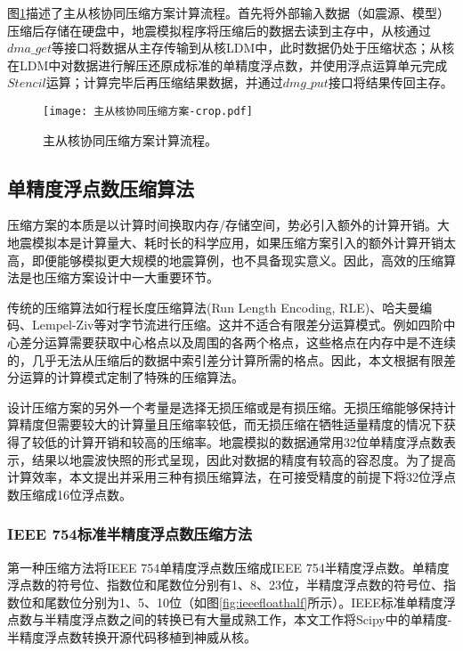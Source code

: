图\ref{fig:compression-workflow}描述了主从核协同压缩方案计算流程。首先将外部输入数据（如震源、模型）压缩后存储在硬盘中，地震模拟程序将压缩后的数据去读到主存中，从核通过$dma\_get$等接口将数据从主存传输到从核LDM中，此时数据仍处于压缩状态；从核在LDM中对数据进行解压还原成标准的单精度浮点数，并使用浮点运算单元完成$Stencil$运算；计算完毕后再压缩结果数据，并通过$dmg\_put$接口将结果传回主存。

\begin{figure}[ht]
\centering
\texttt{[image: 主从核协同压缩方案-crop.pdf]}
\caption{主从核协同压缩方案计算流程。}
\label{fig:compression-workflow}
\end{figure}

\subsection{单精度浮点数压缩算法}

压缩方案的本质是以计算时间换取内存/存储空间，势必引入额外的计算开销。大地震模拟本是计算量大、耗时长的科学应用，如果压缩方案引入的额外计算开销太高，即便能够模拟更大规模的地震算例，也不具备现实意义。因此，高效的压缩算法是也压缩方案设计中一大重要环节。

传统的压缩算法如行程长度压缩算法(Run Length Encoding, RLE)、哈夫曼编码、Lempel-Ziv等对字节流进行压缩。这并不适合有限差分运算模式。例如四阶中心差分运算需要获取中心格点以及周围的各两个格点，这些格点在内存中是不连续的，几乎无法从压缩后的数据中索引差分计算所需的格点。因此，本文根据有限差分运算的计算模式定制了特殊的压缩算法。

设计压缩方案的另外一个考量是选择无损压缩或是有损压缩。无损压缩能够保持计算精度但需要较大的计算量且压缩率较低，而无损压缩在牺牲适量精度的情况下获得了较低的计算开销和较高的压缩率。地震模拟的数据通常用32位单精度浮点数表示，结果以地震波快照的形式呈现，因此对数据的精度有较高的容忍度。为了提高计算效率，本文提出并采用三种有损压缩算法，在可接受精度的前提下将32位浮点数压缩成16位浮点数。

\subsubsection{IEEE 754标准半精度浮点数压缩方法}
第一种压缩方法将IEEE 754单精度浮点数压缩成IEEE 754半精度浮点数。单精度浮点数的符号位、指数位和尾数位分别有1、8、23位，半精度浮点数的符号位、指数位和尾数位分别为1、5、10位（如图\ref{fig:ieeefloathalf}所示）。IEEE标准单精度浮点数与半精度浮点数之间的转换已有大量成熟工作\cite{van2008fast}，本文工作将Scipy\cite{jones2014scipy}中的单精度-半精度浮点数转换开源代码移植到神威从核。

